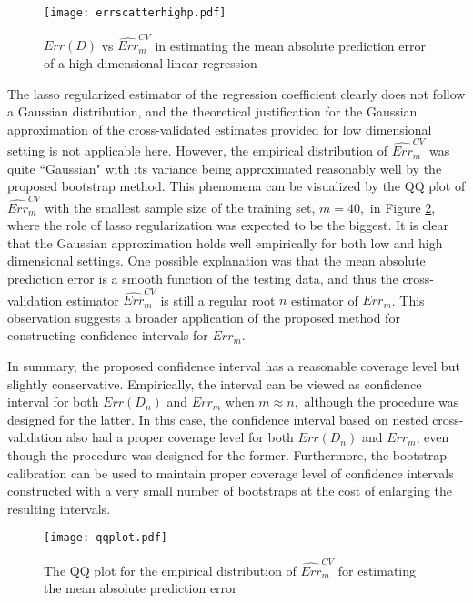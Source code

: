 \documentclass[12pt]{article}
\begin{document}
\begin{figure}
\centering
\texttt{[image: errscatterhighp.pdf]}
\caption{$Err(D)$ vs $\widehat{Err}_m^{CV}$ in estimating the mean absolute prediction error of a high dimensional linear regression}
\label{fig:errscatterhighp}
\end{figure}

 The lasso regularized estimator of the regression coefficient clearly does not follow a Gaussian distribution, and the theoretical justification for the Gaussian approximation of the cross-validated estimates provided for low dimensional setting is not applicable here.  However, the empirical distribution of $\widehat{Err}^{CV}_m$ was quite ``Gaussian" with its variance being approximated reasonably well by the proposed bootstrap method.  This phenomena can be visualized by the QQ plot of $\widehat{Err}_m^{CV}$ with the smallest sample size of the training set, $m=40,$ in Figure \ref{fig:errqq}, where the role of lasso regularization was expected to be the biggest.  It is clear that the Gaussian approximation holds well empirically for both low and high dimensional settings.  One possible explanation was that the mean absolute prediction error is a smooth function of the testing data, and thus the cross-validation estimator $\widehat{Err}^{CV}_m$ is still a regular root $n$ estimator of $Err_m$. This observation suggests a broader application of the proposed method for constructing confidence intervals for $Err_m.$

In summary, the proposed confidence interval has a reasonable coverage level but slightly conservative. Empirically, the interval can be viewed as confidence interval for both $Err(D_n)$ and $Err_m$ when $m\approx n,$ although the procedure was designed for the latter. In this case, the confidence interval based on nested cross-validation also had a proper coverage level for both $Err(D_n)$ and $Err_m$, even though the procedure was designed for the former. Furthermore, the bootstrap calibration can be used to maintain proper coverage level of confidence intervals constructed with a very small number of bootstraps at the cost of enlarging the resulting intervals.


\begin{figure}
\centering
\texttt{[image: qqplot.pdf]}
\caption{The QQ plot for the empirical distribution of $\widehat{Err}^{CV}_m$ for estimating the mean absolute prediction error}
\label{fig:errqq}
\end{figure}
\end{document}
